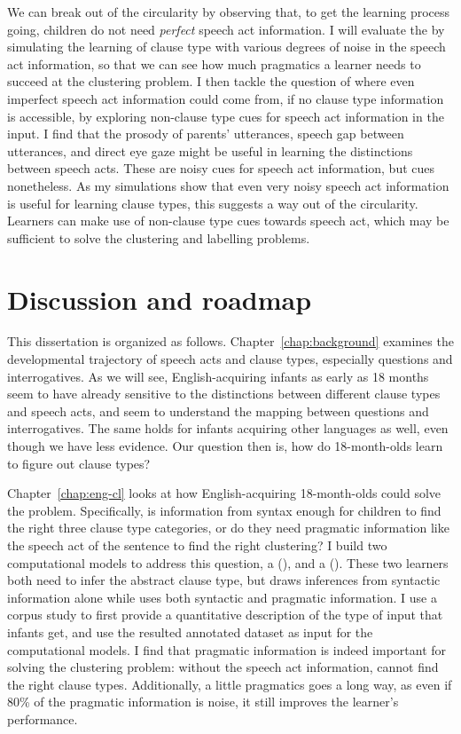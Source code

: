 We can break out of the circularity by observing that, to get the learning process going, children do not need \emph{perfect} speech act information. I will evaluate the \hypos{} by 
simulating the learning of clause type with various degrees of noise in the speech act information, so that we can see how much pragmatics a learner needs to succeed at the clustering problem. I then tackle the question of where even imperfect speech act information could come from, if no clause type information is accessible,
by exploring non-clause type cues for speech act information in the input. I find that the prosody of parents' utterances, speech gap between utterances, and direct eye gaze might be useful in learning the distinctions between speech acts.
These are noisy cues for speech act information, but cues nonetheless. As my simulations show that even very noisy speech act information is useful for learning clause types, this suggests a way out of the circularity. Learners can make use of non-clause type cues towards speech act, which may be sufficient to solve the clustering and labelling problems.

\section{Discussion and roadmap}
\label{sec:intro:roadmap} 

This dissertation is organized as follows. Chapter~\ref{chap:background} examines the developmental trajectory of speech acts and clause types, especially questions and interrogatives. As we will see, English-acquiring infants as early as 18 months seem to have already sensitive to the distinctions between different clause types and speech acts, and seem to understand the mapping between questions and interrogatives. The same holds for infants acquiring other languages as well, even though we have less evidence. Our question then is, how do 18-month-olds learn to figure out clause types?

Chapter~\ref{chap:eng-cl} looks at how English-acquiring 18-month-olds could solve the problem. Specifically, is information from syntax enough for children to find the right three clause type categories, or do they need pragmatic information like the speech act of the sentence to find the right clustering? I build two computational models to address this question, a \distlearner{} (\dlearnerabbr{}), and a \praglearner{} (\plearnerabbr{}). These two learners both need to infer the abstract clause type, but \dlearnerabbr{} draws inferences from syntactic information alone while \plearnerabbr{} uses both syntactic and pragmatic information. I use a corpus study to first provide a quantitative description of the type of input that infants get, and use the resulted annotated dataset as input for the computational models. I find that pragmatic information is indeed important for solving the clustering problem: without the speech act information, \dlearnerabbr{} cannot find the right clause types. Additionally, a little pragmatics goes a long way, as  even if 80\% of the pragmatic information is noise, it still improves the learner's performance. 

